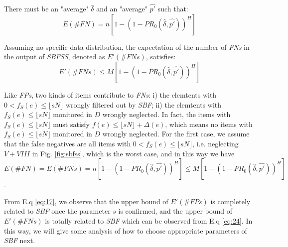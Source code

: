 \documentclass[conference]{IEEEtran}
\begin{document}
\begin{lemma}\label{lem:9}
There must be an "average" $\widehat{\delta}$ and an "average" $\widehat{p'}$ such that: 
\begin{equation}\label{eq:20}
E(\#FN)=n[1-(1-PR_0(\widehat{\delta},\widehat{p'}))^H]
\end{equation}
\end{lemma}

\begin{theorem}\label{thm:7}
	Assuming no specific data distribution, the expectation of the number of \emph{FNs} in the output of \emph{SBFSS}, denoted as $E'(\#FNs)$, satisfies:
	\begin{equation}\label{eq:24}
	E'(\#FNs)\leq M[1-(1-PR_0(\widehat{\delta},\widehat{p'}))^H]
	\end{equation}
\end{theorem}

\begin{IEEEproof}
Like \emph{FPs}, two kinds of items contribute to \emph{FNs}: i) the elemtents with $0<f_S(e)\leq\lfloor sN\rfloor$ wrongly filtered out by \emph{SBF}; ii) the elemtents with $f_S(e)\leq\lfloor sN\rfloor$ monitored in $D$ wrongly neglected. In fact, the items with $f_S(e)\leq\lfloor sN\rfloor$ must satisfy $f(e)\leq\lfloor sN\rfloor+\Delta(e)$, which means no items with $f_S(e)\leq\lfloor sN\rfloor$ monitored in $D$ wrongly neglected. For the first case, we assume that the false negatives are all items with $0<f_S(e)\leq\lfloor sN\rfloor$, i.e. neglecting $V+VIII$ in Fig. \ref{fig:sbfss}, which is the worst case, and in this way we have $E(\#FN)=E(\#FNs)=n[1-(1-PR_0(\widehat{\delta},\widehat{p'}))^H]\leq M[1-(1-PR_0(\widehat{\delta},\widehat{p'}))^H]$.
\end{IEEEproof}
From E.q \ref{eq:17}, we observe that the upper bound of $E'(\#FPs)$ is completely related to \emph{SBF} once the parameter $s$ is confirmed, and the upper bound of $E'(\#FNs)$ is totally related to \emph{SBF} which can be observed from E.q \ref{eq:24}. In this way, we will give some analysis of how to choose appropriate parameters of \emph{SBF} next.
\end{document}
